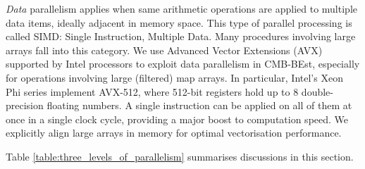 \textit{Data} parallelism applies when same arithmetic operations are applied to multiple data items, ideally adjacent in memory space. This type of parallel processing is called SIMD: Single Instruction, Multiple Data. Many procedures involving large arrays fall into this category. We use Advanced Vector Extensions (AVX) supported by Intel processors to exploit data parallelism in CMB-BEst, especially for operations involving large (filtered) map arrays. In particular, Intel's Xeon Phi series implement AVX-512, where 512-bit registers hold up to 8 double-precision floating numbers. A single instruction can be applied on all of them at once in a single clock cycle, providing a major boost to computation speed. We explicitly align large arrays in memory for optimal vectorisation performance.

Table \ref{table:three_levels_of_parallelism} summarises discussions in this section.

